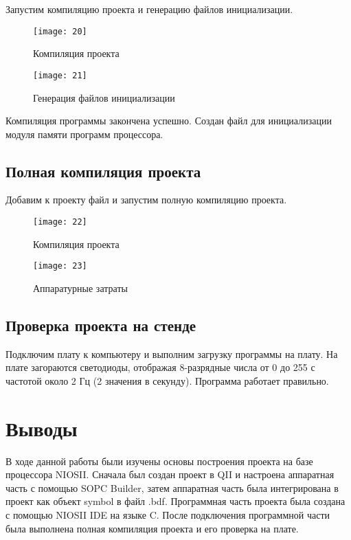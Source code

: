 Запустим компиляцию проекта и генерацию файлов инициализации.
\begin{multicols}{2}
\begin{figure}[H]
	\centering
	\texttt{[image: 20]}
	\caption{Компиляция проекта}
\end{figure}
\begin{figure}[H]
	\centering
	\texttt{[image: 21]}
	\caption{Генерация файлов инициализации}
\end{figure}
\end{multicols}

Компиляция программы закончена успешно. Создан  файл для инициализации модуля памяти программ процессора.

\subsection{Полная компиляция проекта}

Добавим к проекту файл  и запустим полную компиляцию проекта.
\begin{figure}[H]
	\centering
	\texttt{[image: 22]}
	\caption{Компиляция проекта}
\end{figure}
\begin{figure}[H]
	\centering
	\texttt{[image: 23]}
	\caption{Аппаратурные затраты}
\end{figure}

\subsection{Проверка проекта на стенде}

Подключим плату к компьютеру и выполним загрузку программы на плату. На плате загораются светодиоды, отображая 8-разрядные числа от 0 до 255 с частотой около 2 Гц (2 значения в секунду). Программа работает правильно.

\section{Выводы}

В ходе данной работы были изучены основы построения проекта на базе процессора NIOSII. Сначала был создан проект в QII и настроена аппаратная часть с помощью SOPC Builder, затем аппаратная часть была интегрирована в проект как объект symbol в файл .bdf. Программная часть проекта была создана с помощью NIOSII IDE на языке C. После подключения программной части была выполнена полная компиляция проекта и его проверка на плате. 

